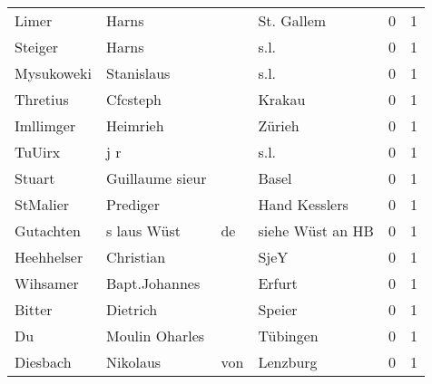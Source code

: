 \begin{tabular}{llllrr}
                    Limer &                              Harns &             &                                  St. Gallem &          0 &         1 \\
                  Steiger &                              Harns &             &                                        s.l. &          0 &         1 \\
               Mysukoweki &                         Stanislaus &             &                                        s.l. &          0 &         1 \\
                 Thretius &                           Cfcsteph &             &                                      Krakau &          0 &         1 \\
                Imllimger &                           Heimrieh &             &                                      Zürieh &          0 &         1 \\
                   TuUirx &                                j r &             &                                        s.l. &          0 &         1 \\
                   Stuart &                    Guillaume sieur &             &                                       Basel &          0 &         1 \\
                 StMalier &                           Prediger &             &                               Hand Kesslers &          0 &         1 \\
                Gutachten &                        s laus Wüst &          de &                            siehe Wüst an HB &          0 &         1 \\
               Heehhelser &                          Christian &             &                                        SjeY &          0 &         1 \\
                 Wihsamer &                      Bapt.Johannes &             &                                      Erfurt &          0 &         1 \\
                   Bitter &                           Dietrich &             &                                      Speier &          0 &         1 \\
                       Du &                     Moulin Oharles &             &                                    Tübingen &          0 &         1 \\
                 Diesbach &                           Nikolaus &         von &                                    Lenzburg &          0 &         1 \\

\end{tabular}
